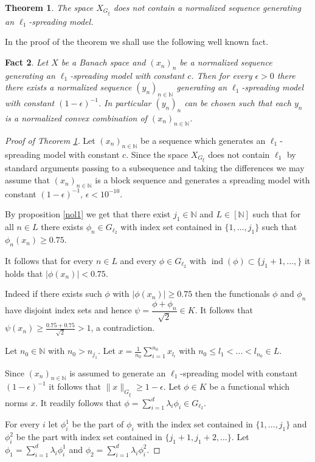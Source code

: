 \documentclass[a4paper]{amsart}
\theoremstyle{plain}
\newtheorem{theorem}{Theorem}[section]
\newtheorem{Fact}[theorem]{Fact}
\newcommand{\N}{\mathbb{N}}
\newcommand{\e}{\epsilon}
\newcommand{\norm}[1][\cdot]{\lVert #1\rVert}
\newcommand{\xn}[1][x]{(#1_{n})_{n\in\N}}
\DeclareMathOperator{\inde}{ind}
\begin{document}
\begin{theorem}\label{pr220}
 The space $X_{G_{\xi}}$ does not contain a normalized sequence generating an $\ell_{1}$-spreading model.
\end{theorem}
In the proof of the theorem we shall use the following well known fact.
\begin{Fact}\label{fact1} Let $X$ be a Banach space and $(x_n)_{n}$ be a normalized sequence generating an $\ell_{1}$-spreading model with constant $c$.
Then for every $\e>0$ there  there exists a normalized sequence
$(y_n)_{n\in\N}$ generating an $\ell_{1}$-spreading model with constant $(1-\e)^{-1}$. In
particular $(y_{n})_{n}$ can be chosen such that each $y_{n}$ is a
normalized convex combination of $\xn$.
\end{Fact}
\begin{proof}[Proof of Theorem \ref{pr220}]
Let $\xn$ be a sequence which generates an $\ell_{1}$-spreading model with constant $c$.
Since the space $X_{G_{\xi}}$ does not contain $\ell_{1}$ by
standard arguments passing  to a subsequence and taking the
differences  we may assume that  $\xn$ is a block sequence and
generates a spreading model with constant $(1-\e)^{-1}$, $\e<10^{-10}$.

By proposition \ref{nol1} we get that there exist  $j_{1}\in\N$ and $L\in[\N]$ such that
for all $n\in L$ there exists $\phi_{n}\in G_{\ell_2}$ with index set contained in
$\{1,\dots,j_1\}$ such that $\phi_{n}(x_n)\geq 0.75$.

It follows that for every $n\in L$ and  every $\phi\in G_{\ell_2}$
with $\inde (\phi)\subset\{j_1+1,\dots,\}$ it holds that $\vert
\phi(x_{n})\vert<0.75$.


Indeed if there exists such  $\phi$ with $\vert\phi(x_n)\vert\geq
0.75$ then the functionals $\phi$ and $\phi_{n}$ have disjoint
index sets and hence $\psi=\dfrac{\phi+\phi_{n}}{\sqrt{2}}\in K$.
It follows that $\psi(x_n)\geq \frac{0.75+0.75}{\sqrt{2}}>1$, a
contradiction.

Let $n_0\in\N$ with  $n_0>n_{j_1}$. Let $x=\frac{1}{n_0}\sum_{i=1}^{n_0}x_{l_{i}}$ with $n_{0}\leq
 l_1<\dots<l_{n_0}\in L$.

Since $\xn$ is assumed to generate an $\ell_{1}$-spreading model with constant $(1-\e)^{-1}$ it
follows that  $\norm[x]_{G_\xi}\geq 1-\e$.
Let $\phi\in K$ be a functional which norms $x$. It readily follows that  $\phi=\sum_{i=1}^{d}\lambda_{i}\phi_{i}\in G_{\ell_2}$.

For every $i$ let $\phi_{i}^{1}$ be the part of $\phi_{i}$ with the
index set contained in $\{1,\dots,j_{1}\}$ and $\phi_{i}^{2}$  be
the part  with index set contained in $\{j_{1}+1,j_{1}+2,\dots\}$.
Let  $\phi_{1}=\sum_{i=1}^{d}\lambda_{i}\phi_{i}^{1}$ and
$\phi_{2}=\sum_{i=1}^{d}\lambda_{i}\phi_{i}^{2}$.


\end{proof}
\end{document}
